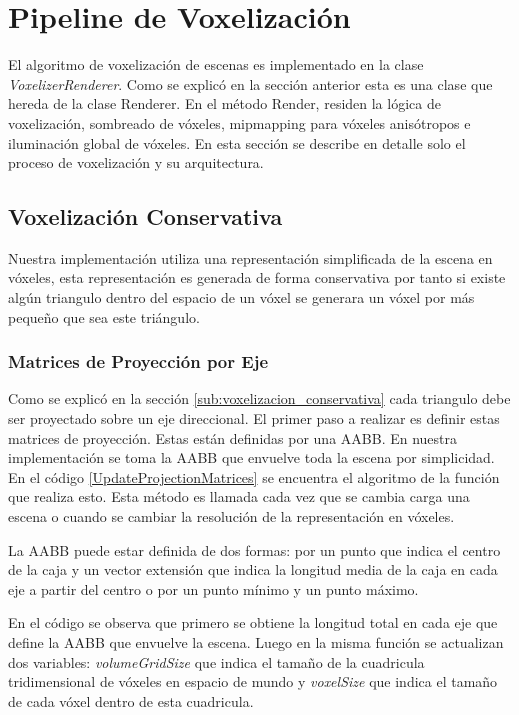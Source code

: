 \section{Pipeline de Voxelización} %
\label{sec:pipeline_de_voxelizacion}
El algoritmo de voxelización de escenas es implementado en la clase \emph{VoxelizerRenderer}. Como se explicó en la sección anterior esta es una clase que hereda de la clase Renderer. En el método Render, residen la lógica de voxelización, sombreado de vóxeles, mipmapping para vóxeles anisótropos e iluminación global de vóxeles. En esta sección se describe en detalle solo el proceso de voxelización y su arquitectura.

\subsection{Voxelización Conservativa} %
\label{sub:voxelization_impl}
Nuestra implementación utiliza una representación simplificada de la escena en vóxeles, esta representación es generada de forma conservativa por tanto si existe algún triangulo dentro del espacio de un vóxel se generara un vóxel por más pequeño que sea este triángulo.
 
\subsubsection{Matrices de Proyección por Eje}

Como se explicó en la sección \ref{sub:voxelizacion_conservativa} cada triangulo debe ser proyectado sobre un eje direccional. El primer paso a realizar es definir estas matrices de proyección. Estas están definidas por una \ac{AABB}. En nuestra implementación se toma la \ac{AABB} que envuelve toda la escena por simplicidad. En el código \ref{UpdateProjectionMatrices} se encuentra el algoritmo de la función que realiza esto. Esta método es llamada cada vez que se cambia carga una escena o cuando se cambiar la resolución de la representación en vóxeles.

La \ac{AABB} puede estar definida de dos formas: por un punto que indica el centro de la caja y un vector extensión que indica la longitud media de la caja en cada eje a partir del centro o por un punto mínimo y un punto máximo. 

En el código se observa que primero se obtiene la longitud total en cada eje que define la \ac{AABB} que envuelve la escena. Luego en la misma función se actualizan dos variables: \emph{volumeGridSize} que indica el tamaño de la cuadricula tridimensional de vóxeles en espacio de mundo y \emph{voxelSize} que indica el tamaño de cada vóxel dentro de esta cuadricula. 

